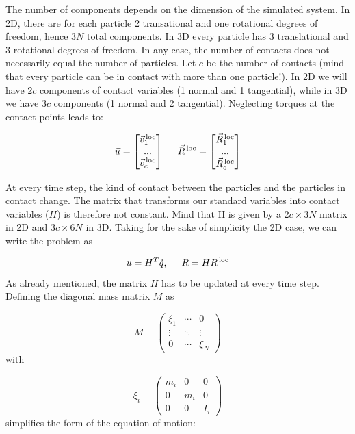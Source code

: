 The number of components depends on the dimension of the simulated system. In 2D, there are for each particle 2 transational and one rotational degrees of freedom, hence 3$N$ total components. In 3D every particle has 3 translational and 3 rotational degrees of freedom. In any case, the number of contacts does not necessarily equal the number of particles. Let $c$ be the number of contacts (mind that every particle can be in contact with more than one particle!). In 2D we will have $2c$ components of contact variables (1 normal and 1 tangential), while in  3D we have $3c$ components (1 normal and 2 tangential). Neglecting torques at the contact points leads to:

$$
\vec{u}=  \begin{bmatrix} \vec{v}^{\,\text{loc}}_1\\ \text{...}\\ \vec{v}^{\,\text{loc}}_c \end{bmatrix}
\hspace{.5cm} 
\vec{R}^{\,\text{loc}}=  \begin{bmatrix} \vec{R}^{\,\text{loc}}_1\\ ...\\ \vec{R}^{\,\text{loc}}_c \end{bmatrix}
$$



At every time step, the kind of contact between the particles and the particles in contact change. The matrix that transforms our standard variables into contact variables ($H$) is therefore not constant.  Mind that H is given by a $2c\times3N$ matrix in 2D and $3c\times6N$ in 3D. Taking for the sake of simplicity the 2D case, we can write the problem as

\begin{equation*}
u= H^T \dot{q}, 
\hspace{0.5cm}
R= HR^{\,\text{loc}}
\end{equation*}
As already mentioned, the matrix $H$ has to be updated at every time step. Defining the diagonal mass matrix $M$ as

\begin{equation*}
M \equiv
 \begin{pmatrix}
  \xi_1 	&  \cdots & 0 \\
  \vdots&  \ddots & \vdots  \\
  0 	&  \cdots & \xi_N
 \end{pmatrix}
\end{equation*}
with

\begin{equation*}
\xi_i \equiv
 \begin{pmatrix}
  m_i 	&  0 	& 0 \\
  0 	&  m_i	& 0  \\
  0 	&  0 	& I_i
 \end{pmatrix}
\end{equation*}
simplifies the form of the equation of motion:



